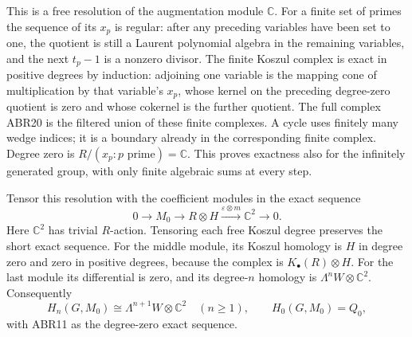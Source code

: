 This is a free resolution of the augmentation module $\mathbb C$.
For a finite set of primes the sequence of its $x_p$ is regular:
after any preceding variables have been set to one, the quotient
is still a Laurent polynomial algebra in the remaining variables,
and the next $t_p-1$ is a nonzero divisor. The finite Koszul complex
is exact in positive degrees by induction: adjoining one variable
is the mapping cone of multiplication by that variable's $x_p$,
whose kernel on the preceding degree-zero quotient is zero and
whose cokernel is the further quotient. The full complex ABR20 is
the filtered union of these finite complexes. A cycle uses finitely
many wedge indices; it is a boundary already in the corresponding
finite complex. Degree zero is $R/(x_p:p\text{ prime})=\mathbb C$.
This proves exactness also for the infinitely generated group, with
only finite algebraic sums at every step.

Tensor this resolution with the coefficient modules in the exact
sequence
\[
 0\longrightarrow M_0\longrightarrow R\otimes H
          \xrightarrow{\varepsilon\otimes m}\mathbb C^2
          \longrightarrow0.
\]
Here $\mathbb C^2$ has trivial $R$-action. Tensoring each free
Koszul degree preserves the short exact sequence. For the middle
module, its Koszul homology is $H$ in degree zero and zero in
positive degrees, because the complex is $K_\bullet(R)\otimes H$.
For the last module its differential is zero, and its degree-$n$
homology is $\Lambda^nW\otimes\mathbb C^2$. Consequently
\begin{equation}\tag{ABR21}
 H_n(G,M_0)\cong\Lambda^{n+1}W\otimes\mathbb C^2
            \quad(n\ge1),
 \qquad H_0(G,M_0)=Q_0,
\end{equation}
with ABR11 as the degree-zero exact sequence.

